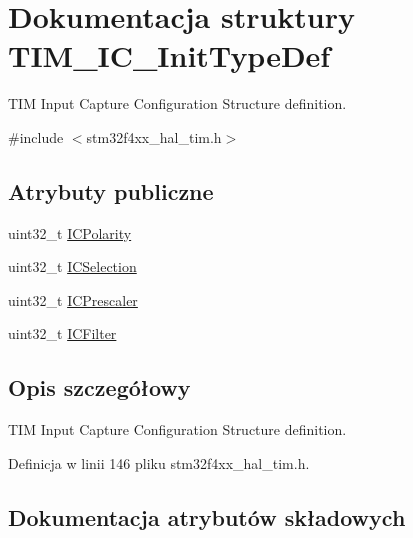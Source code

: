 \hypertarget{struct_t_i_m___i_c___init_type_def}{}\section{Dokumentacja struktury T\+I\+M\+\_\+\+I\+C\+\_\+\+Init\+Type\+Def}
\label{struct_t_i_m___i_c___init_type_def}


T\+IM Input Capture Configuration Structure definition.  




{\ttfamily \#include $<$stm32f4xx\+\_\+hal\+\_\+tim.\+h$>$}

\subsection*{Atrybuty publiczne}
\begin{DoxyCompactItemize}
\item 
uint32\+\_\+t \hyperlink{struct_t_i_m___i_c___init_type_def_ab122383ebc0926c49a814546471da9b3}{I\+C\+Polarity}
\item 
uint32\+\_\+t \hyperlink{struct_t_i_m___i_c___init_type_def_aad80556490de79727ba1269c851e9724}{I\+C\+Selection}
\item 
uint32\+\_\+t \hyperlink{struct_t_i_m___i_c___init_type_def_a452a4a459b6f7b7c478db032de9b0d72}{I\+C\+Prescaler}
\item 
uint32\+\_\+t \hyperlink{struct_t_i_m___i_c___init_type_def_ae8432aa11b5495b252ac7ae299eabb32}{I\+C\+Filter}
\end{DoxyCompactItemize}


\subsection{Opis szczegółowy}
T\+IM Input Capture Configuration Structure definition. 

Definicja w linii 146 pliku stm32f4xx\+\_\+hal\+\_\+tim.\+h.



\subsection{Dokumentacja atrybutów składowych}
\mbox{\label{struct_t_i_m___i_c___init_type_def_ae8432aa11b5495b252ac7ae299eabb32}} 
